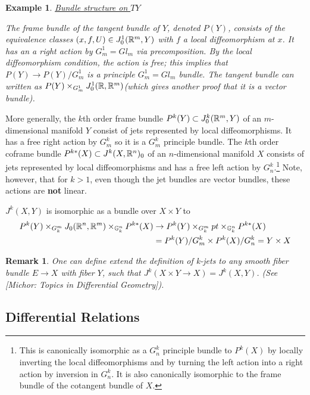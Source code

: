 \documentclass{article}
\newtheorem{example}[theorem]{Example}
\newtheorem{proposed work}[theorem]{Proposed Work}
\newtheorem{remark}[theorem]{Remark}
\begin{document}
\begin{example}{\underline{Bundle structure on $TY$}}

 The frame bundle of the tangent bundle of $Y$, denoted $P(Y)$, consists of the equivalence classes $(x,f, U)  \in  J^1_0(\mathbb R^m,Y)$ with $f$ a local diffeomorphism at $x$.  It has an a right action by $G^1_m=Gl_m$ via precomposition.  By the local diffeomorphism condition, the action is free; this implies that $P(Y) \to P(Y)/G^1_m$ is a principle $G^1_m=Gl_m$ bundle.  The tangent bundle can written as $ P(Y)  \times_{G^1_m} J^1_0(\mathbb R, \mathbb R^m)$(which gives another proof that it is a vector bundle).

\end{example}

More generally, the $k$th order frame bundle $P^k(Y) \subset J_0^k(\mathbb R^m,Y)$ of an $m$-dimensional manifold $Y$ consist of jets represented by local diffeomorphisms. It has a free right action by $G^k_m$ so it is a $G^k_m$ principle bundle. The $k$th order coframe bundle $P^{k*}(X) \subset J^k(X,\mathbb R^n)_0$ of an $n$-dimensional manifold $X$ consists of jets represented by local diffeomorphisms and has a free left action by $G^k_n$.\footnote{This is canonically isomorphic as a $G^k_n$ principle bundle to $P^k(X)$ by locally inverting the local diffeomorphisms and by turning the left action into a right action by inversion in $G^k_n$.  It is also canonically isomorphic to the frame bundle of the cotangent bundle of $X$.} Note, however, that for $k>1$, even though the jet bundles are vector bundles, these actions are \textbf{not} linear.

$J^k(X,Y)$ is isomorphic as a bundle over $X \times Y$ to
\begin{align*}
P^k(Y) \times_{G^m_k} J_0(\mathbb R^n,\mathbb R^m) \times_{\mathbb G^n_k} P^{k*}(X) &\to P^k(Y) \times_{G^m_k} pt \times_{\mathbb G^n_k} P^{k*}(X)   \\&=  P^k(Y)/G^k_m \times P^k(X)/G^k_n=Y \times X
\end{align*}


\begin{remark}
One can define extend the definition of k-jets to any smooth fiber bundle $E\to X$ with fiber $Y$, such that $J^k(X\times Y\to X)=J^k(X,Y)$. (See [Michor: Topics in Differential Geometry]).
\end{remark}

\subsection{Differential Relations}
\end{document}
